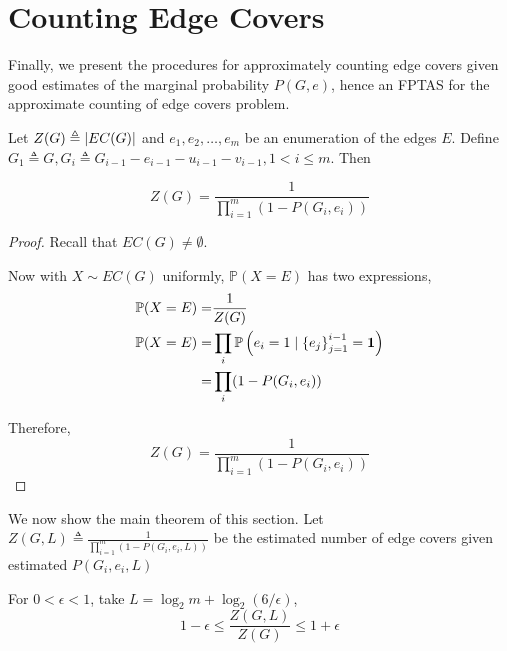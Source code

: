 \section{Counting Edge Covers}

Finally, we present the procedures for approximately counting edge covers given good estimates of the marginal probability $P(G,e)$, hence an FPTAS for the approximate counting of edge covers problem.

\begin{proposition}

	Let $Z(G) \triangleq \left\vert EC(G)\right\vert$ and $e_1,e_2,\ldots,e_m$ be an enumeration of the edges $E$. Define $G_1 \triangleq G, G_i \triangleq G_{i-1} - e_{i-1} - u_{i-1} - v_{i-1}, 1 < i \leq m $. Then

	\[ Z(G) = \frac{1}{\prod_{i=1}^m (1 - P(G_i, e_i))} \]

\end{proposition}

\begin{proof}
	Recall that $EC(G) \neq \emptyset$.%

	Now with $X \sim EC(G)$ uniformly, $\mathbb{P}(X=E)$ has two expressions,
	\begin{align*}
		\mathbb{P} (X = E) =& \frac{1}{Z(G)} \\
		\mathbb{P} (X = E) =& \prod_i \mathbb{P} \left(e_i = 1 \mid \left\{e_j\right\}_{j=1}^{i-1} = \mathbf{1} \right) \\
		=&\prod_i (1- P(G_i, e_i))
	\end{align*}

	Therefore, %
	\[ Z(G) = \frac{1}{\prod_{i=1}^m (1 - P(G_i, e_i))} \]
\end{proof}

We now show the main theorem of this section.
Let $Z(G, L) \triangleq \frac{1}{\prod_{i=1}^m (1 - P(G_i, e_i, L))}$ be the estimated number of edge covers given estimated $P(G_i, e_i, L)$

\begin{theorem}
	For $0< \epsilon <1$, take $L=\log_2 m + \log_2(6/ \epsilon) $,
	\[ 1- \epsilon \leq \frac{Z(G, L)}{Z(G)} \leq 1+ \epsilon\]
\end{theorem}

